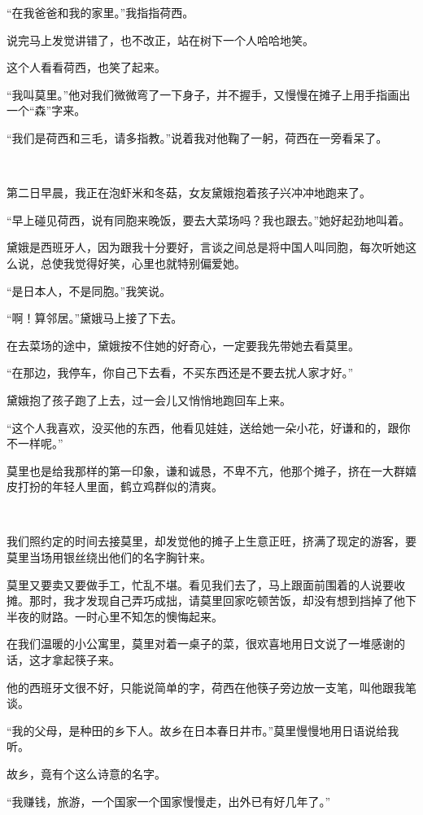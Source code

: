 \par “在我爸爸和我的家里。”我指指荷西。
\par 说完马上发觉讲错了，也不改正，站在树下一个人哈哈地笑。
\par 这个人看看荷西，也笑了起来。
\par “我叫莫里。”他对我们微微弯了一下身子，并不握手，又慢慢在摊子上用手指画出一个“森”字来。
\par “我们是荷西和三毛，请多指教。”说着我对他鞠了一躬，荷西在一旁看呆了。
\par  
\par 第二日早晨，我正在泡虾米和冬菇，女友黛娥抱着孩子兴冲冲地跑来了。
\par “早上碰见荷西，说有同胞来晚饭，要去大菜场吗？我也跟去。”她好起劲地叫着。
\par 黛娥是西班牙人，因为跟我十分要好，言谈之间总是将中国人叫同胞，每次听她这么说，总使我觉得好笑，心里也就特别偏爱她。
\par “是日本人，不是同胞。”我笑说。
\par “啊！算邻居。”黛娥马上接了下去。
\par 在去菜场的途中，黛娥按不住她的好奇心，一定要我先带她去看莫里。
\par “在那边，我停车，你自己下去看，不买东西还是不要去扰人家才好。”
\par 黛娥抱了孩子跑了上去，过一会儿又悄悄地跑回车上来。
\par “这个人我喜欢，没买他的东西，他看见娃娃，送给她一朵小花，好谦和的，跟你不一样呢。”
\par 莫里也是给我那样的第一印象，谦和诚恳，不卑不亢，他那个摊子，挤在一大群嬉皮打扮的年轻人里面，鹤立鸡群似的清爽。
\par  
\par 我们照约定的时间去接莫里，却发觉他的摊子上生意正旺，挤满了现定的游客，要莫里当场用银丝绕出他们的名字胸针来。
\par 莫里又要卖又要做手工，忙乱不堪。看见我们去了，马上跟面前围着的人说要收摊。那时，我才发现自己弄巧成拙，请莫里回家吃顿苦饭，却没有想到挡掉了他下半夜的财路。一时心里不知怎的懊悔起来。
\par 在我们温暖的小公寓里，莫里对着一桌子的菜，很欢喜地用日文说了一堆感谢的话，这才拿起筷子来。
\par 他的西班牙文很不好，只能说简单的字，荷西在他筷子旁边放一支笔，叫他跟我笔谈。
\par “我的父母，是种田的乡下人。故乡在日本春日井市。”莫里慢慢地用日语说给我听。
\par 故乡，竟有个这么诗意的名字。
\par “我赚钱，旅游，一个国家一个国家慢慢走，出外已有好几年了。”
